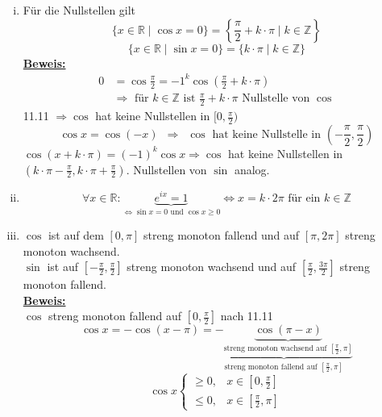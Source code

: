 \begin{enumerate}[(i)]
	\item Für die Nullstellen gilt
	\[
		\{  x \in \mathds{R} \mid \cos x = 0 \} = \left\{ \frac{\pi}{2} + k \cdot \pi \mid k \in \mathds{Z} \right\}
	\]
	\[
		\{ x \in \mathds{R} \mid \sin x = 0 \} = \{ k \cdot \pi \mid k \in \mathds{Z}\}
	\]
	\underline{\textbf{Beweis:}} \\
	\begin{align*}
		0 &= \cos \frac{\pi}{2} = {-1}^k \cos (\frac{\pi}{2} + k \cdot  \pi ) \\
		&\Rightarrow  \text{ für } k \in \mathds{Z} \text{ ist } \frac{\pi}{2} + k \cdot \pi \text{ Nullstelle von } \cos
	\end{align*}
	11.11 $\Rightarrow \cos$ hat keine Nullstellen in $[0, \frac{\pi}{2})$
	\[
		\cos x = \cos (-x) \enspace \Rightarrow \enspace \cos \text{ hat keine Nullstelle in } \left(- \frac{\pi}{2} , \frac{\pi}{2}\right)
	\]
	$\cos (x+ k \cdot \pi)= (-1)^k \cos x \Rightarrow \cos$ hat keine Nullstellen in $ \left( k \cdot \pi - \frac{\pi}{2} , k \cdot \pi + \frac{\pi}{2} \right) $. 
	Nullstellen von $\sin$ analog. 
	\item 
	\[
		\forall x \in \mathds{R} : \underbrace{e^{ix}= 1}_{\Leftrightarrow \sin x = 0 \text{ und } \cos x \ge 0} 
		\Leftrightarrow x=k \cdot 2 \pi \text{ für ein } k \in \mathds{Z}
	\]
	\item $\cos$ ist auf dem $[0, \pi ]$ streng monoton fallend und auf $[\pi , 2 \pi ]$ streng monoton wachsend.
	\vspace{10pt} \\
	$\sin$ ist auf $[- \frac{\pi}{2} , \frac{\pi}{2}]$ streng monoton wachsend und auf $[\frac{\pi}{2} , \frac{ 3 \pi}{2}]$ streng monoton fallend.
	\vspace{\baselineskip} \\
	\underline{\textbf{Beweis:}} \\
	$\cos$ streng monoton fallend auf $[0, \frac{\pi}{2}]$ nach 11.11
	\[
		\cos x = - \cos (x - \pi ) = \underbrace{- \underbrace{\cos (\pi  -x)}_{\text{streng monoton wachsend auf } [\frac{\pi}{2} , \pi ]}}
		_{\text{streng monoton fallend auf } [\frac{\pi}{2}, \pi ]}
	\]
	\[
		\cos x \begin{cases}
			\ge 0, & x \in [0, \frac{\pi}{2}]\\
			\le 0 , & x \in [\frac{\pi}{2} ,\pi ]
			

\end{cases}\]
\end{enumerate}
